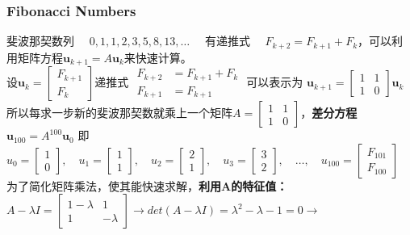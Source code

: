\documentclass[UTF8]{article}
\begin{document}
    \subsubsection{Fibonacci Numbers}
    斐波那契数列 $\quad 0,1,1,2,3,5,8,13, \ldots \quad$ 有递推式 $\quad F_{k+2}=F_{k+1}+F_{k}$，可以利用矩阵方程$\mathbf{u}_{k+1}=A \boldsymbol{u}_{k}$来快速计算。
    \\
    设$\bm{u}_{k}=\left[\begin{array}{c}{F_{k+1}} \\ {F_{k}}\end{array}\right] $\quad 递推式 $\begin{aligned} F_{k+2} &=F_{k+1}+F_{k} \\ F_{k+1} &=F_{k+1} \end{aligned}$ 可以表示为 $\bm{u}_{k+1}=\left[\begin{array}{cc}{1} & {1} \\ {1} & {0}\end{array}\right] \bm{u}_{k}$
    \\
    所以每求一步新的斐波那契数就乘上一个矩阵$A=\left[\begin{array}{ll}{1} & {1} \\ {1} & {0}\end{array}\right]$，\textbf{差分方程}$\bm{u}_{100} = A^{100} \bm{u}_0$ 即
    $u_{0}=\left[\begin{array}{l}{1} \\ {0}\end{array}\right], \quad u_{1}=\left[\begin{array}{l}{1} \\ {1}\end{array}\right], \quad u_{2}=\left[\begin{array}{l}{2} \\ {1}\end{array}\right], \quad u_{3}=\left[\begin{array}{l}{3} \\ {2}\end{array}\right], \quad \ldots, \quad u_{100}=\left[\begin{array}{l}{F_{101}} \\ {F_{100}}\end{array}\right]$
    \\
    为了简化矩阵乘法，使其能快速求解，\textbf{利用A的特征值：}\\
    $A-\lambda I=\left[\begin{array}{cc}{1-\lambda} & {1} \\ {1} & {-\lambda}\end{array}\right] \rightarrow det(A-\lambda I)=\lambda^{2}-\lambda-1=0 \rightarrow$\\
\end{document}
